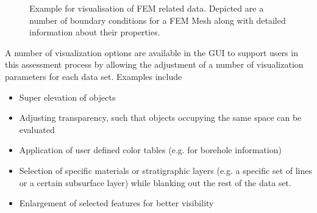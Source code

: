 \begin{figure}[tb]
\begin{center}
\enspace
{}
\end{center}
\caption{Example for visualisation of FEM related data. Depicted are a number of boundary conditions for a FEM Mesh along with detailed information about their properties.} \label{fig:kr:cond}
\end{figure}

A number of visualization options are available in the GUI to support users in this assessment process by allowing the adjustment of a number of visualization parameters for each data set. Examples include

\begin{itemize}\addtolength{\itemsep}{-0.3\baselineskip}
\item Super elevation of objects
\item Adjusting transparency, such that objects occupying the same space can be evaluated
\item Application of user defined color tables (e.g. for borehole information)
\item Selection of specific materials or stratigraphic layers (e.g. a specific set of lines or a certain subsurface layer) while blanking out the rest of the data set.
\item Enlargement of selected features for better visibility
\end{itemize}

